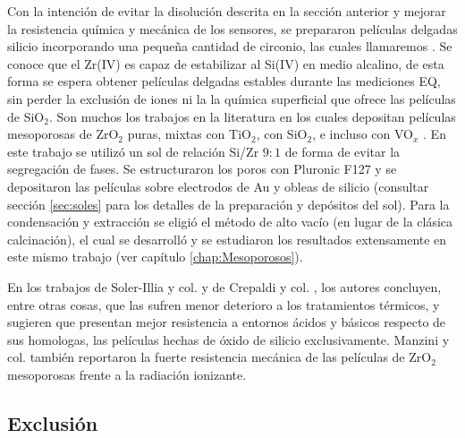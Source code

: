 			Con la intención de evitar la disolución descrita en la sección anterior y mejorar la resistencia química y mecánica de los sensores, se prepararon películas delgadas silicio incorporando una pequeña cantidad de circonio, las cuales llamaremos \pdmZ. Se conoce que el Zr(IV) es capaz de estabilizar al Si(IV) en medio alcalino\cite{Soler-Illia2004}, de esta forma se espera obtener películas delgadas estables durante las mediciones EQ, sin perder la exclusión de iones ni la la química superficial que ofrece las películas de SiO$_2$. Son muchos los trabajos en la literatura en los cuales depositan películas mesoporosas de ZrO$_2$ puras, mixtas con TiO$_2$, con SiO$_2$, e incluso con VO$_x$ \cite{Soler-Illia2004,Crepaldi2002a,Gimenez2016,Zelcer2013,Calvo20210,Angelome2008}. En este trabajo se utilizó un sol de relación Si/Zr $9\!:\!1$ de forma de evitar la segregación de fases\cite{Soler-Illia2004}. Se estructuraron los poros con Pluronic F127 y se depositaron las películas sobre electrodos de Au  y obleas de silicio (consultar sección \ref{sec:soles} para los detalles de la preparación y depósitos del sol). Para la condensación y extracción se eligió el método de alto vacío (en lugar de la clásica calcinación), el cual se desarrolló y se estudiaron los resultados extensamente en este mismo trabajo (ver capítulo \ref{chap:Mesoporosos}).

			En los trabajos de  Soler-Illia y col.\cite{Soler-Illia2004} y de Crepaldi y col. \cite{Crepaldi2002a}, los autores concluyen, entre otras cosas, que las \pdmZ\space sufren menor deterioro a los tratamientos térmicos, y sugieren que presentan mejor resistencia a entornos ácidos y básicos respecto de sus homologas, las películas hechas de óxido de silicio exclusivamente. Manzini y col.\cite{Gimenez2016} también reportaron la fuerte resistencia mecánica de las películas de ZrO$_2$ mesoporosas frente a la radiación ionizante.

	 \subsection{Exclusión}

